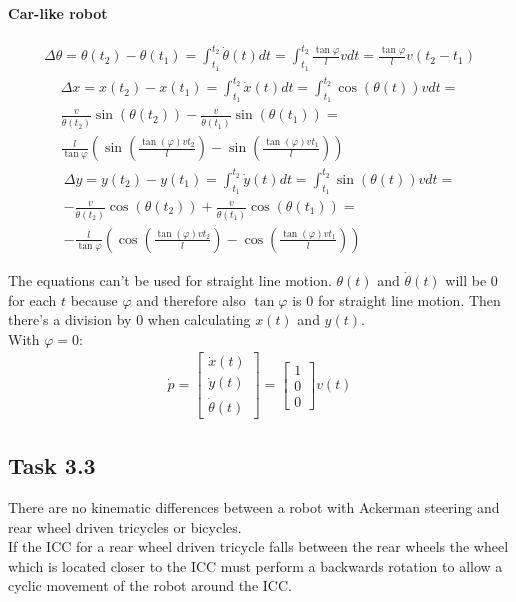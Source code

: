 \documentclass{article}
\begin{document}
	\paragraph{Car-like robot}
	\begin{gather}
	\Delta \theta = \theta(t_{2}) - \theta(t_{1}) = \int_{t_{1}}^{t_{2}} \dot{\theta}(t) dt = \int_{t_{1}}^{t_{2}} \frac{\tan \varphi}{l} v dt = \frac{\tan \varphi}{l} v (t_{2} - t_{1})
	\end{gather}
	\begin{gather}
	\nonumber \Delta x = x(t_{2}) - x(t_{1}) = \int_{t_{1}}^{t_{2}} \dot{x}(t) dt = \int_{t_{1}}^{t_{2}} \cos(\theta(t)) v dt =\\
	\nonumber \frac{v}{\dot{\theta}(t_{2})} \sin(\theta(t_{2})) - \frac{v}{\dot{\theta}(t_{1})} \sin(\theta(t_{1})) =\\
	\frac{l}{\tan \varphi}(\sin(\frac{\tan(\varphi)vt_{2}}{l}) - \sin(\frac{\tan(\varphi)vt_{1}}{l}))
	\end{gather}
	\begin{gather}
	\nonumber \Delta y = y(t_{2}) - y(t_{1}) = \int_{t_{1}}^{t_{2}} \dot{y}(t) dt = \int_{t_{1}}^{t_{2}} \sin(\theta(t)) v dt =\\
	\nonumber -\frac{v}{\dot{\theta}(t_{2})} \cos(\theta(t_{2})) + \frac{v}{\dot{\theta}(t_{1})} \cos(\theta(t_{1})) =\\
	-\frac{l}{\tan \varphi}(\cos(\frac{\tan(\varphi)vt_{2}}{l}) - \cos(\frac{\tan(\varphi)vt_{1}}{l}))
	\end{gather}
	
	The equations can't be used for straight line motion. $\theta(t)$ and $\dot{\theta}(t)$ will be 0 for each $t$ because $\varphi$ and therefore also $\tan \varphi$ is 0 for straight line motion. Then there's a division by 0 when calculating $x(t)$ and $y(t)$.\\
	
	With $\varphi = 0$:
	\begin{gather}
	\dot{p} = 
	\begin{bmatrix}
	\dot{x}(t)\\
	\dot{y}(t)\\
	\dot{\theta}(t)
	\end{bmatrix} = 
	\begin{bmatrix}
	1\\
	0\\
	0
	\end{bmatrix} v(t)
	\end{gather}
	
	\subsection{Task 3.3}
	There are no kinematic differences between a robot with Ackerman steering and rear wheel driven tricycles or bicycles.\\
	If the ICC for a rear wheel driven tricycle falls between the rear wheels the wheel which is located closer to the ICC must perform a backwards rotation to allow a cyclic movement of the robot around the ICC.
	
\end{document}

